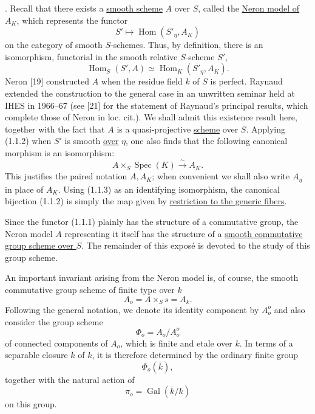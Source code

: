 \medskip
{}. Recall that there exists a \underline{smooth scheme} $A$ over
$S$, called the \underline{Neron model of $A_K$}, which represents the
functor
\begin{equation}\tag{1.1.1}
 S'\longmapsto\operatorname{Hom}(S'_\eta,A_K)
\end{equation}
on the category of smooth $S$-schemes.  Thus, by definition, there is
an isomorphism, functorial in the smooth relative $S$-scheme $S'$,
\begin{equation}\tag{1.1.2}
 \operatorname{Hom}_S(S',A)\simeq
 \operatorname{Hom}_K(S'_\eta,A_K).
\end{equation}
Neron [19] constructed $A$ when the residue field $k$ of $S$ is
perfect.  Raynaud extended the construction to the general case in an
unwritten seminar held at IHES in 1966--67 (see [21] for the statement
of Raynaud's principal results, which complete those of Neron in
loc. cit.).  We shall admit this existence result here, together with
the fact that $A$ is a quasi-projective \underline{scheme} over $S$.
Applying (1.1.2) when $S'$ is smooth \underline{over} $\eta$, one also
finds that the following canonical morphism is an isomorphism:
\begin{equation}\tag{1.1.3}
 A\times_S\operatorname{Spec}(K)\xrightarrow{\ \sim\ }A_K.
\end{equation}
This justifies the paired notation $A,A_K$; when convenient we shall
also write $A_\eta$ in place of $A_K$.  Using (1.1.3) as an identifying
isomorphism, the canonical bijection (1.1.2) is simply the map given by
\underline{restriction to the generic fibers}.

Since the functor (1.1.1) plainly has the structure of a commutative
group, the Neron model $A$ representing it itself has the structure of
a \underline{smooth commutative group scheme over $S$}.  The remainder
of this expos\'e is devoted to the study of this group scheme.

An important invariant arising from the Neron model is, of course, the
smooth commutative group scheme of finite type over $k$
\begin{equation}\tag{1.1.4}
 A_o=A\times_Ss=A_k.
\end{equation}
Following the general notation, we denote its identity component by
$A_o^o$ and also consider the group scheme
\begin{equation}\tag{1.1.5}
 \Phi_o=A_o/A_o^o
\end{equation}
of connected components of $A_o$, which is finite and etale over $k$.
In terms of a separable closure $\overline k$ of $k$, it is therefore
determined by the ordinary finite group
\begin{equation}\tag{1.1.6}
 \Phi_o(\overline k),
\end{equation}
together with the natural action of
\[
 \pi_o=\operatorname{Gal}(\overline k/k)
\]
on this group.

